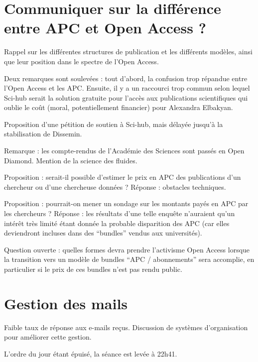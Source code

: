 \documentclass[a4paper]{article}
\begin{document}
\section{Communiquer sur la différence entre APC et Open Access ?}

Rappel sur les différentes structures de publication et les différents modèles, ainsi que leur position dans le spectre de l'Open Access.

Deux remarques sont soulevées : tout d'abord, la confusion trop répandue entre l'Open Access et les APC. Ensuite, il y a un raccourci trop commun selon lequel Sci-hub serait la solution gratuite pour l'accès aux publications scientifiques qui oublie le coût (moral, potentiellement financier) pour Alexandra Elbakyan. 

Proposition d'une pétition de soutien à Sci-hub, mais délayée jusqu'à la stabilisation de Dissemin. 

Remarque : les compte-rendus de l'Académie des Sciences sont passés en Open Diamond. Mention de la science des fluides. 

Proposition : serait-il possible d'estimer le prix en APC des publications d'un chercheur ou d'une chercheuse données ? Réponse : obstacles techniques. 

Proposition : pourrait-on mener un sondage sur les montants payés en APC par les chercheurs ? Réponse : les résultats d'une telle enquête n'auraient qu'un intérêt très limité étant donnée la probable disparition des APC (car elles deviendront incluses dans des ``bundles'' vendus aux universités). 

Question ouverte : quelles formes devra prendre l'activisme Open Access lorsque la transition vers un modèle de bundles ``APC / abonnements'' sera accomplie, en particulier si le prix de ces bundles n'est pas rendu public.


\section{Gestion des mails}
Faible taux de réponse aux e-mails reçus. Discussion de systèmes d'organisation pour améliorer cette gestion.



\bigskip

L'ordre du jour étant épuisé, la séance est levée à 22h41. 
\end{document}
